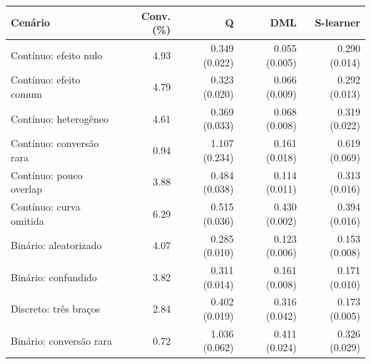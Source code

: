 \begin{tabular}{lrrrr}
\toprule
Cenário & Conv. (\%) & Q & DML & S-learner \\
\midrule
Contínuo: efeito nulo & 4.93 & 0.349 (0.022) & 0.055 (0.005) & 0.290 (0.014) \\
Contínuo: efeito comum & 4.79 & 0.323 (0.020) & 0.066 (0.009) & 0.292 (0.013) \\
Contínuo: heterogêneo & 4.61 & 0.369 (0.033) & 0.068 (0.008) & 0.319 (0.022) \\
Contínuo: conversão rara & 0.94 & 1.107 (0.234) & 0.161 (0.018) & 0.619 (0.069) \\
Contínuo: pouco overlap & 3.88 & 0.484 (0.038) & 0.114 (0.011) & 0.313 (0.016) \\
Contínuo: curva omitida & 6.29 & 0.515 (0.036) & 0.430 (0.002) & 0.394 (0.016) \\
Binário: aleatorizado & 4.07 & 0.285 (0.010) & 0.123 (0.006) & 0.153 (0.008) \\
Binário: confundido & 3.82 & 0.311 (0.014) & 0.161 (0.008) & 0.171 (0.010) \\
Discreto: três braços & 2.84 & 0.402 (0.019) & 0.316 (0.042) & 0.173 (0.005) \\
Binário: conversão rara & 0.72 & 1.036 (0.062) & 0.411 (0.024) & 0.326 (0.029) \\
\bottomrule
\end{tabular}
